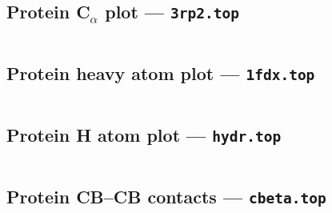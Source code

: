 \vspace{1cm}
\def\epsfsize#1#2{\scalea #1}

\newpage

\subsection{Protein C$_{\alpha}$ plot --- {\tt 3rp2.top}}

\vspace{1.0cm}

\begin{verbatim}

\end{verbatim}

\vspace{0.4cm}
\def\epsfsize#1#2{\scalea #1}

\newpage

\subsection{Protein heavy atom plot --- {\tt 1fdx.top}}

\vspace{0.4cm}

\begin{verbatim}

\end{verbatim}

\vspace{0.4cm}
\def\epsfsize#1#2{\scalea #1}

\newpage

\subsection{Protein H atom plot --- {\tt hydr.top}}

\vspace{0.4cm}

\begin{verbatim}

\end{verbatim}

\vspace{0.4cm}
\def\epsfsize#1#2{\scalea #1}

\newpage

\subsection{Protein CB--CB contacts --- {\tt cbeta.top}}


